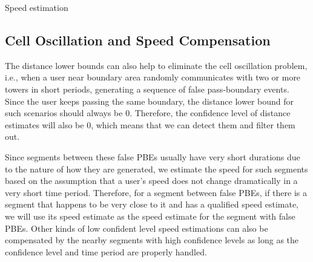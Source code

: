 \begin{algorithm}
 \caption{Speed estimation}\label{alg:speed_est}
\end{algorithm}


\subsection{Cell Oscillation and Speed Compensation}

The distance lower bounds can also help to eliminate the cell oscillation problem, i.e., when a user near boundary area randomly communicates with two or more towers in short periods, generating a sequence of false pass-boundary events. Since the user keeps passing the same boundary, the distance lower bound for such scenarios should always be $0$. Therefore, the confidence level of distance estimates will also be $0$, which means that we can detect them and filter them out.

Since segments between these false PBEs usually have very short durations due to the nature of how they are generated, we estimate the speed for such segments based on the assumption that a user's speed does not change dramatically in a very short time period. Therefore, for a segment between false PBEs, if there is a segment that happens to be very close to it and has a qualified speed estimate,  we will use its speed estimate as the speed estimate for the segment with false PBEs. Other kinds of low confident level speed estimations can also be compensated by the nearby segments with high confidence levels as long as the confidence level and time period are properly handled.

